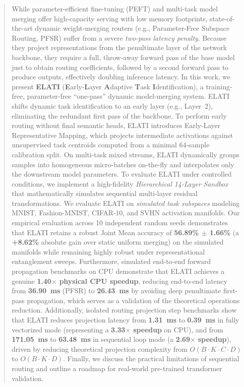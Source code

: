 \begin{abstract}
While parameter-efficient fine-tuning (PEFT) and multi-task model merging offer high-capacity serving with low memory footprints, state-of-the-art dynamic weight-merging routers (e.g., Parameter-Free Subspace Routing, PFSR) suffer from a severe \emph{two-pass latency penalty}. Because they project representations from the penultimate layer of the network backbone, they require a full, throw-away forward pass of the base model just to obtain routing coefficients, followed by a second forward pass to produce outputs, effectively doubling inference latency.
In this work, we present \textbf{ELATI} (\textbf{E}arly-\textbf{L}ayer \textbf{A}daptive \textbf{T}ask \textbf{I}dentification), a training-free, parameter-free ``one-pass'' dynamic model-merging system.
ELATI shifts dynamic task identification to an early layer (e.g., Layer~2), eliminating the redundant first pass of the backbone.
To perform early routing without final semantic heads, ELATI introduces Early-Layer Representative Mapping, which projects intermediate activations against unsupervised task centroids computed from a minimal 64-sample calibration split.
On multi-task mixed streams, ELATI dynamically groups samples into homogeneous micro-batches on-the-fly and interpolates only the downstream model parameters.
To evaluate ELATI under controlled conditions, we implement a high-fidelity \emph{Hierarchical 14-Layer Sandbox} that mathematically simulates sequential multi-layer residual transformations.
We evaluate ELATI on \emph{simulated task subspaces} modeling MNIST, Fashion-MNIST, CIFAR-10, and SVHN activation manifolds.
Our empirical evaluation across 10 independent random seeds demonstrates that ELATI retains a robust Joint Mean accuracy of \textbf{56.89\% $\pm$ 1.66\%} (a \textbf{+8.62\%} absolute gain over static uniform merging) on the simulated manifolds while remaining highly robust under representational entanglement sweeps.
Furthermore, simulated end-to-end forward propagation benchmarks on CPU demonstrate that ELATI achieves a genuine \textbf{1.40$\times$ physical CPU speedup}, reducing end-to-end latency from \textbf{36.90~ms} (PFSR) to \textbf{26.43~ms} by avoiding deep penultimate first-pass propagation, which serves as a validation of the theoretical operations reduction.
Additionally, isolated routing projection step benchmarks show that ELATI reduces projection latency from \textbf{1.31~ms} to \textbf{0.39~ms} in fully vectorized mode (representing a \textbf{3.33$\times$ speedup} on CPU), and from \textbf{171.05~ms} to \textbf{63.48~ms} in sequential loop mode (a \textbf{2.69$\times$ speedup}), driven by reducing theoretical projection complexity from $O(B \cdot K \cdot C \cdot D)$ to $O(B \cdot K \cdot D)$.
Finally, we discuss the practical limitations of sequential routing and outline a roadmap for real-world pre-trained transformer validation.
\end{abstract}

